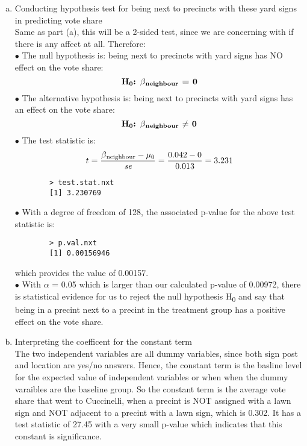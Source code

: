 \documentclass[12pt,letterpaper]{article}
\begin{document}
\begin{enumerate} [(a)]
		\item Conducting hypothesis test for being next to precincts with these yard signs in predicting vote share \\
		Same as part (a), this will be a 2-sided test, since we are concerning with if there is any affect at all. Therefore: \\
		$\bullet$ The null hypothesis is: being next to precincts with yard signs has NO effect on the vote share:
		$${\textbf{H\textsubscript{0}: $\beta$\textsubscript{neighbour} = 0}}$$
		$\bullet$ The alternative hypothesis is: being next to precincts with yard signs has an effect on the vote share:
		$${\textbf{H\textsubscript{0}: $\beta$\textsubscript{neighbour} $\neq$ 0}}$$
		$\bullet$ The test statistic is:
		$${t = \frac{\beta\textsubscript{neighbour}	 - \mu\textsubscript{0}}{\textit{se}}} = \frac{0.042 - 0}{0.013} = 3.231 $$
		
		\begin{verbatim}
		> test.stat.nxt
		[1] 3.230769
		\end{verbatim}
		$\bullet$ With a degree of freedom of 128, the associated p-value for the above test statistic is:
		
		\begin{verbatim}
		> p.val.nxt
		[1] 0.00156946
		\end{verbatim}
		which provides the value of 0.00157. \\
		$\bullet$ With $\alpha$ = 0.05 which is larger than our calculated p-value of 0.00972, there is statistical evidence for us to reject the null hypothesis H\textsubscript{0} and say that being in a precint next to a precint in the treatment group has a positive effect on the vote share.
		
		\item Interpreting the coefficent for the constant term \\
		The two independent variables are all dummy variables, since both sign post and location are yes/no answers. Hence, the constant term is the basline level for the expected value of independent variables or when when the dummy varaibles are the baseline group. So the constant term is the average vote share that went to Cuccinelli, when a precint is NOT assigned with a lawn sign and NOT adjacent to a precint with a lawn sign, which is 0.302. It has a test statistic of 27.45 with a very small p-value which indicates that this constant is significance.
		

\end{enumerate}
\end{document}
